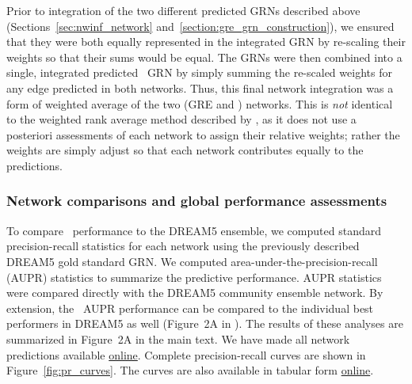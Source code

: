 Prior to integration of the two different predicted GRNs described
above (Sections~\ref{sec:nwinf_network}
and~\ref{section:gre_grn_construction}), we ensured that they were
both equally represented in the integrated GRN by re-scaling their
weights so that their sums would be equal. The GRNs were then combined
into a single, integrated predicted \egrine\ GRN by simply summing the
re-scaled weights for any edge predicted in both networks. Thus, this
final network integration was a form of weighted average of the two
(GRE and \nwinf) networks. This is {\it not} identical to the weighted
rank average method described by \cite{Marbach2012}, as it does not
use a posteriori assessments of each network to assign their relative
weights; rather the weights are simply adjust so that each network
contributes equally to the predictions.

\subsubsection{Network comparisons and global performance assessments}
\label{sec:network_comparisons}

To compare \egrine\ performance to the DREAM5 ensemble, we computed
standard precision-recall statistics for each network using the
previously described DREAM5 gold standard GRN.  We computed
area-under-the-precision-recall (AUPR) statistics to summarize the
predictive performance. AUPR statistics were compared directly with
the DREAM5 community ensemble network. By extension, the \egrine~AUPR
performance can be compared to the individual best performers in
DREAM5 as well (Figure~2A in \cite{Marbach2012}). The results of these
analyses are summarized in Figure~2A in the main text. We have made
all network predictions available
\href{http://egrin2.systemsbiology.net/}{online}. Complete
precision-recall curves are shown in Figure~\ref{fig:pr_curves}. The
curves are also available in tabular form
\href{http://egrin2.systemsbiology.net/}{online}.

